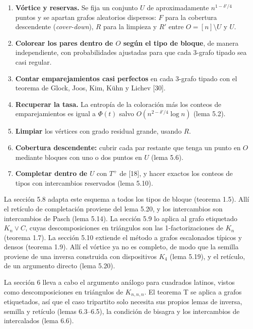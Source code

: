 \documentclass[spanish,11pt,a4paper]{article}
\providecommand{\tightlist}{\setlength{\itemsep}{0pt}\setlength{\parskip}{0pt}}
\begin{document}
\begin{enumerate}
\def\labelenumi{\arabic{enumi}.}
\tightlist
\item
  \textbf{Vórtice y reservas.} Se fija un conjunto \(U\) de aproximadamente \(n^{1-\delta'/4}\) puntos y se apartan grafos aleatorios dispersos: \(F\) para la cobertura descendente (\emph{cover-down}), \(R\) para la limpieza y \(R'\) entre \(O=[n]\setminus U\) y \(U\).
\item
  \textbf{Colorear los pares dentro de \(O\) según el tipo de bloque}, de manera independiente, con probabilidades ajustadas para que cada 3-grafo tipado sea casi regular.
\item
  \textbf{Contar emparejamientos casi perfectos} en cada 3-grafo tipado con el teorema de Glock, Joos, Kim, Kühn y Lichev {[}30{]}.
\item
  \textbf{Recuperar la tasa.} La entropía de la coloración más los conteos de emparejamientos es igual a \(\Phi(t)\) salvo \(O(n^{2-\delta'/4}\log n)\) (lema 5.2).
\item
  \textbf{Limpiar} los vértices con grado residual grande, usando \(R\).
\item
  \textbf{Cobertura descendente:} cubrir cada par restante que tenga un punto en \(O\) mediante bloques con uno o dos puntos en \(U\) (lema 5.6).
\item
  \textbf{Completar dentro de \(U\)} con \(T^+\) de {[}18{]}, y hacer exactos los conteos de tipos con intercambios reservados (lema 5.10).
\end{enumerate}

La sección 5.8 adapta este esquema a todos los tipos de bloque (teorema 1.5). Allí el retículo de completación proviene del lema 5.20, y los intercambios son intercambios de Pasch (lema 5.14). La sección 5.9 lo aplica al grafo etiquetado \(K_n\vee C\), cuyas descomposiciones en triángulos son las 1-factorizaciones de \(K_n\) (teorema 1.7). La sección 5.10 extiende el método a grafos escalonados típicos y densos (teorema 1.9). Allí el vórtice ya no es completo, de modo que la semilla proviene de una inversa construida con dispositivos \(K_4\) (lema 5.19), y el retículo, de un argumento directo (lema 5.20).

La sección 6 lleva a cabo el argumento análogo para cuadrados latinos, vistos como descomposiciones en triángulos de \(K_{n,n,n}\). El teorema T se aplica a grafos etiquetados, así que el caso tripartito solo necesita sus propios lemas de inversa, semilla y retículo (lemas 6.3--6.5), la condición de bisagra y los intercambios de intercalados (lema 6.6).
\end{document}
